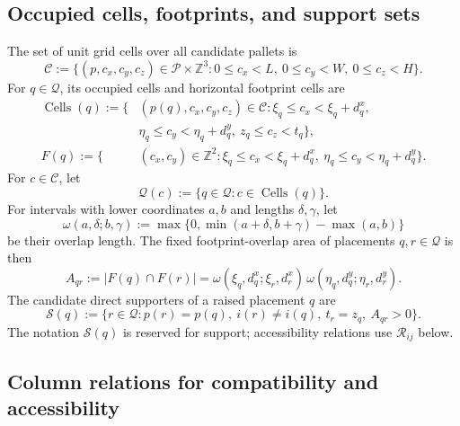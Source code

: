 \documentclass[11pt]{article}
\newcommand{\Pallet}{\mathcal{P}}
\newcommand{\Place}{\mathcal{Q}}
\newcommand{\Cell}{\mathcal{C}}
\newcommand{\Support}{\mathcal{S}}
\begin{document}
\subsection{Occupied cells, footprints, and support sets}

The set of unit grid cells over all candidate pallets is
\begin{equation}
  \Cell:=\{(p,c_x,c_y,c_z)\in\Pallet\times\mathbb Z^3:
  0\le c_x<L,\ 0\le c_y<W,\ 0\le c_z<H\}.
  \label{eq:cell-set}
\end{equation}
For $q\in\Place$, its occupied cells and horizontal footprint cells are
\begin{align}
  \operatorname{Cells}(q):=\{&(p(q),c_x,c_y,c_z)\in\Cell:
  \xi_q\le c_x<\xi_q+d_q^x,\\
  &\eta_q\le c_y<\eta_q+d_q^y,\ z_q\le c_z<t_q\},\\
  F(q):=\{&(c_x,c_y)\in\mathbb Z^2:
  \xi_q\le c_x<\xi_q+d_q^x,\ \eta_q\le c_y<\eta_q+d_q^y\}.
  \label{eq:placement-cells}
\end{align}
For $c\in\Cell$, let
\begin{equation}
  \Place(c):=\{q\in\Place:c\in\operatorname{Cells}(q)\}.
  \label{eq:cell-placement-set}
\end{equation}
For intervals with lower coordinates $a,b$ and lengths $\delta,\gamma$, let
\begin{equation}
  \omega(a,\delta;b,\gamma):=
  \max\{0,\min(a+\delta,b+\gamma)-\max(a,b)\}
  \label{eq:interval-overlap}
\end{equation}
be their overlap length.  The fixed footprint-overlap area of placements
$q,r\in\Place$ is then
\begin{equation}
  A_{qr}:=|F(q)\cap F(r)|
  =\omega(\xi_q,d_q^x;\xi_r,d_r^x)\,
   \omega(\eta_q,d_q^y;\eta_r,d_r^y).
  \label{eq:overlap-area}
\end{equation}
The candidate direct supporters of a raised placement $q$ are
\begin{equation}
  \Support(q):=\{r\in\Place:p(r)=p(q),\ i(r)\ne i(q),\ t_r=z_q,\ A_{qr}>0\}.
  \label{eq:support-set}
\end{equation}
The notation $\Support(q)$ is reserved for support; accessibility relations
use $\mathcal R_{ij}$ below.

\subsection{Column relations for compatibility and accessibility}
\end{document}

